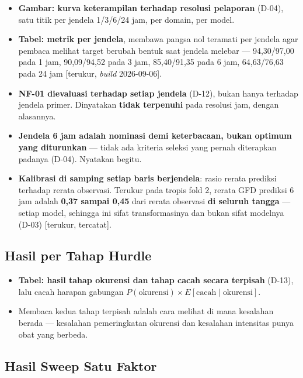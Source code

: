\begin{itemize}
    \item \textbf{Gambar: kurva keterampilan terhadap resolusi pelaporan}
          (D-04), satu titik per jendela 1/3/6/24 jam, per domain, per model.
    \item \textbf{Tabel: metrik per jendela}, membawa pangsa nol teramati per
          jendela agar pembaca melihat target berubah bentuk saat jendela
          melebar --- 94,30/97,00 pada 1 jam, 90,09/94,52 pada 3 jam,
          85,40/91,35 pada 6 jam, 64,63/76,63 pada 24 jam
          [terukur, \textit{build} 2026-09-06].
    \item \textbf{NF-01 dievaluasi terhadap setiap jendela} (D-12), bukan hanya
          terhadap jendela primer. Dinyatakan \textbf{tidak terpenuhi} pada
          resolusi jam, dengan alasannya.
    \item \textbf{Jendela 6 jam adalah nominasi demi keterbacaan, bukan optimum
          yang diturunkan} --- tidak ada kriteria seleksi yang pernah
          diterapkan padanya (D-04). Nyatakan begitu.
    \item \textbf{Kalibrasi di samping setiap baris berjendela}: rasio rerata
          prediksi terhadap rerata observasi. Terukur pada tropis fold 2,
          rerata GFD prediksi 6 jam adalah \textbf{0,37 sampai 0,45} dari rerata
          observasi \textbf{di seluruh tangga} --- setiap model, sehingga ini
          sifat transformasinya dan bukan sifat modelnya (D-03)
          [terukur, tercatat].
\end{itemize}

\subsection{Hasil per Tahap Hurdle}

\begin{itemize}
    \item \textbf{Tabel: hasil tahap okurensi dan tahap cacah secara terpisah}
          (D-13), lalu cacah harapan gabungan
          $P(\text{okurensi}) \times E[\text{cacah}\mid\text{okurensi}]$.
    \item Membaca kedua tahap terpisah adalah cara melihat di mana kesalahan
          berada --- kesalahan pemeringkatan okurensi dan kesalahan intensitas
          punya obat yang berbeda.
\end{itemize}

\subsection{Hasil Sweep Satu Faktor}

